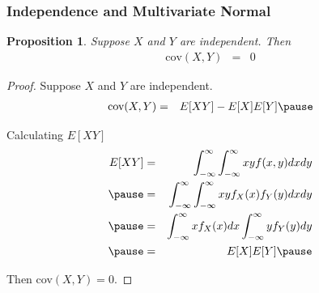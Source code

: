 \documentclass{beamer}
\newtheorem{prop}{Proposition}
\numberwithin{equation}{section}
\begin{document}
\begin{frame}
\frametitle{Independence and Multivariate Normal}

\begin{prop}
Suppose $X$ and $Y$ are independent.  Then 
\begin{eqnarray}
\text{cov}(X, Y) & = & 0 \nonumber 
\end{eqnarray}

\end{prop}



\end{frame}


\begin{frame}
\begin{small}
\begin{proof}
Suppose $X$ and $Y$ are independent.  \pause 
\begin{eqnarray}
\text{cov}(X, Y) & = & E[XY] - E[X]E[Y] \nonumber  \pause 
\end{eqnarray}

Calculating $E[XY]$ \pause 
\begin{eqnarray}
E[XY] & = & \int_{-\infty}^{\infty} \int_{-\infty}^{\infty} x y f(x,y)dxdy \nonumber \\ \pause 
& =& \int_{-\infty}^{\infty} \int_{-\infty}^{\infty} x y f_{X}(x) f_{Y}(y)dxdy \nonumber \\ \pause 
& = & \int_{-\infty}^{\infty} x f_{X}(x) dx \int_{-\infty}^{\infty} y f_{Y}(y) dy \nonumber \\ \pause 
& = & E[X] E[Y] \nonumber \pause 
\end{eqnarray}

Then cov$(X,Y) = 0$.


\end{proof}

\end{small}


\end{frame}
\end{document}
